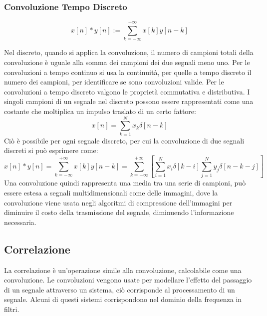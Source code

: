 \documentclass{article}
\numberwithin{equation}{subsection}
\begin{document}
\subsubsection{Convoluzione Tempo Discreto}

\begin{equation*}
    x[n]*y[n]:=\displaystyle\sum_{k=-\infty}^{+\infty}x[k]y[n-k]
\end{equation*}

Nel discreto, quando si applica la convoluzione, il numero di campioni totali della convoluzione è uguale alla somma dei campioni dei due segnali meno uno. Per le convoluzioni 
a tempo continuo si usa la continuità, per quelle a tempo discreto il numero dei campioni, per identificare se sono convoluzioni valide. Per le convoluzioni a tempo discreto valgono le proprietà 
commutativa e distributiva. I singoli campioni di un segnale nel discreto possono essere rappresentati come una costante che moltiplica un impulso traslato di un certo fattore:
\begin{equation*}
    x[n]=\displaystyle\sum_{k=1}^Nx_k\delta[n-k]
\end{equation*}
Ciò è possibile per ogni segnale discreto, per cui la convoluzione di due segnali discreti si può esprimere come:
\begin{equation*}
    x[n]*y[n]=\displaystyle\sum_{k=-\infty}^{+\infty}x[k]y[n-k]=\sum_{k=-\infty}^{+\infty}\left[\sum_{i=1}^Nx_i\delta[k-i]\sum_{j=1}^Ny_j\delta[n-k-j]\right]
\end{equation*}
Una convoluzione quindi rappresenta una media tra una serie di campioni, può essere estesa a segnali multidimensionali come delle immagini, dove la convoluzione viene 
usata negli algoritmi di compressione dell'immagini per diminuire il costo della trasmissione del segnale, diminuendo l'informazione necessaria. 

\subsection{Correlazione}
\label{sec:correlazione}
La correlazione è un'operazione simile alla convoluzione, calcolabile come una convoluzione. Le convoluzioni vengono usate per modellare l'effetto del passaggio di un segnale 
attraverso un sistema, ciò corrisponde al processamento di un segnale. Alcuni di questi sistemi corrispondono nel dominio della frequenza in filtri. 
\end{document}
